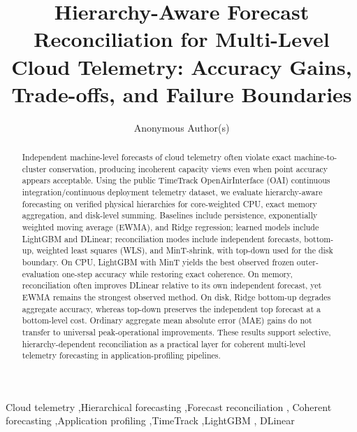 \documentclass[a4paper,fleqn]{cas-dc}
\begin{document}
\let\WriteBookmarks\relax


\title[mode=title]{Hierarchy-Aware Forecast Reconciliation for Multi-Level Cloud Telemetry: Accuracy Gains, Trade-offs, and Failure Boundaries}

\author[1]{Anonymous Author(s)}

\begin{abstract}
Independent machine-level forecasts of cloud telemetry often violate exact
machine-to-cluster conservation, producing incoherent capacity views even when
point accuracy appears acceptable. Using the public TimeTrack OpenAirInterface
({OAI}) continuous integration/continuous deployment telemetry dataset, we
evaluate hierarchy-aware forecasting on verified physical hierarchies for
core-weighted {CPU}, exact memory aggregation, and disk-level summing.
Baselines include persistence, exponentially weighted moving average ({EWMA}),
and Ridge regression; learned models include LightGBM and DLinear; reconciliation
modes include independent forecasts, bottom-up, weighted least squares ({WLS}),
and MinT-shrink, with top-down used for the disk boundary.
On {CPU}, LightGBM with MinT yields the best observed frozen outer-evaluation
one-step accuracy while restoring exact coherence.
On memory, reconciliation often improves DLinear relative to its own independent
forecast, yet {EWMA} remains the strongest observed method.
On disk, Ridge bottom-up degrades aggregate accuracy, whereas top-down preserves
the independent top forecast at a bottom-level cost.
Ordinary aggregate mean absolute error ({MAE}) gains do not transfer to universal
peak-operational improvements.
These results support selective, hierarchy-dependent reconciliation as a practical
layer for coherent multi-level telemetry forecasting in application-profiling
pipelines.
\end{abstract}

\begin{keywords}
Cloud telemetry \sep Hierarchical forecasting \sep Forecast reconciliation \sep
Coherent forecasting \sep Application profiling \sep TimeTrack \sep LightGBM \sep
{DLinear}
\end{keywords}

\maketitle
\end{document}
